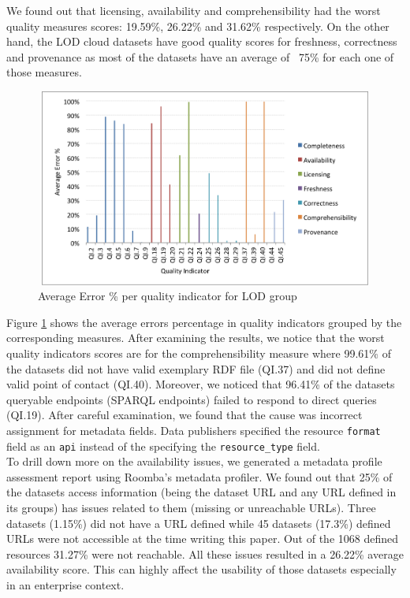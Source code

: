 \documentclass[onecolumn, crcready]{iosart2c}
\begin{document}
We found out that licensing, availability and comprehensibility had the worst quality measures scores: 19.59\%, 26.22\% and 31.62\% respectively. On the other hand, the LOD cloud datasets have good quality scores for freshness, correctness and provenance as most of the datasets have an average of ~75\% for each one of those measures.

\begin{figure}[ht]
  \centering
    \includegraphics[height=6.5cm, width=12cm]{LOD_quality_indicators_grouped.png}
  \caption{Average Error \% per quality indicator for LOD group}
  \label{fig:2}
\end{figure}

Figure \ref{fig:2} shows the average errors percentage in quality indicators grouped by the corresponding measures. After examining the results, we notice that the worst quality indicators scores are for the comprehensibility measure where 99.61\% of the datasets did not have valid exemplary RDF file (QI.37) and did not define valid point of contact (QI.40). Moreover, we noticed that 96.41\% of the datasets queryable endpoints (SPARQL endpoints) failed to respond to direct queries (QI.19). After careful examination, we found that the cause was incorrect assignment for metadata fields. Data publishers specified the resource \texttt{format} field as an \texttt{api} instead of the specifying the \texttt{resource\_type} field.\\

To drill down more on the availability issues, we generated a metadata profile assessment report using Roomba's metadata profiler. We found out that 25\% of the datasets access information (being the dataset URL and any URL defined in its groups) has issues related to them (missing or unreachable URLs).
Three datasets (1.15\%) did not have a URL defined while 45 datasets (17.3\%) defined URLs were not accessible at the time writing this paper. Out of the 1068 defined resources 31.27\% were not reachable. All these issues resulted in a 26.22\% average availability score. This can highly affect the usability of those datasets especially in an enterprise context.
\end{document}
